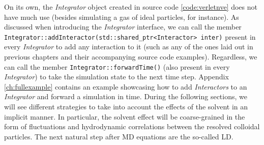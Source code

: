 \documentclass[twoside,openright,titlepage,numbers=noenddot,%
headinclude,footinclude,cleardoublepage=empty,abstract=on,
BCOR=5mm,fontsize=11pt, dvipsnames, paper=b5
]{scrreprt}
\def\ucpp{uammd_cpp_lexer.py:UAMMDCppLexer -x}
\begin{document}
On its own, the \emph{Integrator} object created in source code \ref{code:verletnve} does not have much use (besides simulating a gas of ideal particles, for instance). As discussed when introducing the \emph{Integrator} interface, we can call the member \texttt{Integrator::addInteractor(std::shared_ptr<Interactor> inter)} present in every \emph{Integrator} to add any interaction to it (such as any of the ones laid out in previous chapters and their accompanying source code examples). Regardless, we can call the member \texttt{Integrator::forwardTime()} (also present in every \emph{Integrator}) to take the simulation state to the next time step. Appendix \ref{ch:fullexample} contains an example showcasing how to add \emph{Interactors} to an \emph{Integrator} and forward a simulation in time.
%
During the following sections, we will see different strategies to take into account the effects of the solvent in an implicit manner. In particular, the solvent effect will be coarse-grained in the form of fluctuations and hydrodynamic correlations between the resolved colloidal particles.
The next natural step after \gls{MD} equations are the so-called \gls{LD}.
\end{document}
